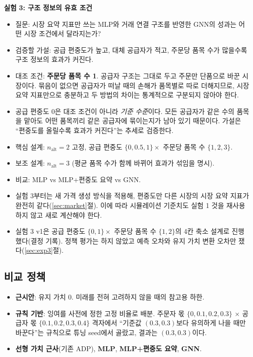 \documentclass[11pt,a4paper]{article}
\begin{document}
\textbf{실험 3: 구조 정보의 유효 조건}
\begin{itemize}[leftmargin=1.5em]
  \item 질문: 시장 요약 지표만 쓰는 MLP와 거래 연결 구조를 반영한 GNN의 성과는
        어떤 시장 조건에서 달라지는가?
  \item 검증할 가설: 공급 편중도가 높고, 대체 공급자가 적고, 주문당 품목 수가 많을수록
        구조 정보의 효과가 커진다.
  \item 대조 조건: \textbf{주문당 품목 수 1}. 공급자 구조는 그대로 두고 주문만 단품으로 바꾼 시장이다.
        묶음이 없으면 공급자가 떠날 때의 손해가 품목별로 따로 더해지므로, 시장 요약 지표만으로
        충분하고 두 방법의 차이는 통계적으로 구분되지 않아야 한다.
  \item 공급 편중도 0은 대조 조건이 아니라 \emph{기준 수준}이다. 모든 공급자가 같은 수의 품목을 맡아도
        어떤 품목끼리 같은 공급자에 묶이는지가 남아 있기 때문이다. 가설은
        ``편중도를 올릴수록 효과가 커진다''는 추세로 검증한다.
  \item 핵심 설계: $n_{\mathrm{alt}}=2$ 고정, 공급 편중도 $\{0,0.5,1\}\times$ 주문당 품목 수 $\{1,2,3\}$.
  \item 보조 설계: $n_{\mathrm{alt}}=3$ (평균 품목 수가 함께 바뀌어 효과가 섞임을 명시).
  \item 비교: MLP vs MLP+편중도 요약 vs GNN.
  \item 실험 3부터는 새 가격 생성 방식을 적용해, 편중도만 다른 시장의 시장 요약 지표가 완전히 같다(\ref{sec:market}절).
        이에 따라 시뮬레이션 기준치도 실험 1 것을 재사용하지 않고 새로 계산해야 한다.
  \item 실험 3 v1은 공급 편중도 $\{0,1\}\times$ 주문당 품목 수 $\{1,2\}$의 4칸 축소 설계로 진행했다(결정 기록).
        정책 평가는 하지 않았고 예측 오차와 유지 가치 변환 오차만 쟀다(\ref{sec:exp3}절).
\end{itemize}

\subsection{비교 정책}

\begin{itemize}[leftmargin=1.5em]
  \item \textbf{근시안}: 유지 가치 0. 미래를 전혀 고려하지 않을 때의 참고용 하한.
  \item \textbf{규칙 기반}: 잉여를 사전에 정한 고정 비율로 배분. 주문자 몫 $\{0,0.1,0.2,0.3\}$
        $\times$ 공급자 몫 $\{0.1,0.2,0.3,0.4\}$ 격자에서 ``기준값 $(0.3,0.3)$보다 유의하게
        나을 때만 바꾼다''는 규칙으로 튜닝 seed에서 골랐고, 결과는 $(0.3,0.3)$이다.
  \item \textbf{선형 가치 근사}(기존 ADP), \textbf{MLP}, \textbf{MLP+편중도 요약}, \textbf{GNN}.
\end{itemize}
\end{document}
